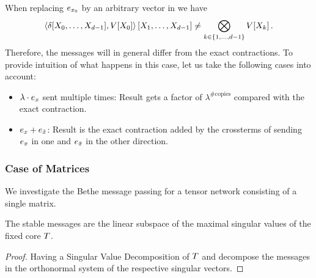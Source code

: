 When replacing $e_{x_{0}}$ by an arbitrary vector in  we have
	\[ \left\langle \delta[X_{0},\ldots,X_{d-1}], V[X_{0}]\right\rangle \left[ X_{1},\ldots,X_{d-1} \right] 
		\neq \bigotimes_{k\in\{1,\ldots,d-1\}} V[{X_{k}}]  \, . \]
Therefore, the messages will in general differ from the exact contractions.
To provide intuition of what happens in this case, let us take the following cases into account:
\begin{itemize}
	\item $\lambda\cdot e_{x}$ sent multiple times: Result gets a factor of $\lambda^{\# \text{copies}}$ compared with the exact contraction.
	\item $e_{x}+e_{\tilde{x}}$: Result is the exact contraction added by the crossterms of sending $e_{x}$ in one and $e_{\tilde{x}}$ in the other direction.
\end{itemize}	



\subsubsection{Case of Matrices}


We investigate the Bethe message passing for a tensor network consisting of a single matrix.

\begin{theorem}
	The stable messages are the linear subspace of the maximal singular values of the fixed core $T$.
\end{theorem}
\begin{proof}
	Having a Singular Value Decomposition of $T$ and decompose the messages in the orthonormal system of the respective singular vectors.
\end{proof}


